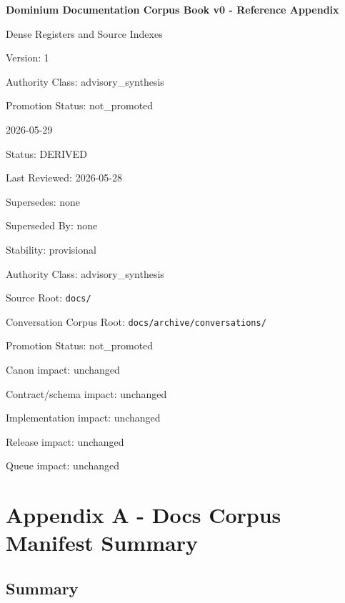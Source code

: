 \documentclass[9pt,a4paper]{book}
\begin{document}
\frontmatter
\begin{titlepage}
\centering
\vspace*{1.8cm}
{\Huge\bfseries Dominium Documentation Corpus Book v0 - Reference Appendix\par}
\vspace{0.7cm}
{\Large Dense Registers and Source Indexes\par}
\vspace{1.1cm}
{\large Version: 1\par}
{\large Authority Class: advisory\_synthesis\par}
{\large Promotion Status: not\_promoted\par}
\vfill
{\large 2026-05-29\par}
\end{titlepage}
\tableofcontents
\mainmatter
Status: DERIVED

Last Reviewed: 2026-\allowbreak{}05-\allowbreak{}28

Supersedes: none

Superseded By: none

Stability: provisional

Authority Class: advisory\_\allowbreak{}synthesis

Source Root: \texttt{docs/\allowbreak{}}

Conversation Corpus Root: \texttt{docs/\allowbreak{}archive/\allowbreak{}conversations/\allowbreak{}}

Promotion Status: not\_\allowbreak{}promoted

Canon impact: unchanged

Contract/\allowbreak{}schema impact: unchanged

Implementation impact: unchanged

Release impact: unchanged

Queue impact: unchanged


\part{Appendix A -\allowbreak{} Docs Corpus Manifest Summary}



\chapter{Summary}
\end{document}
